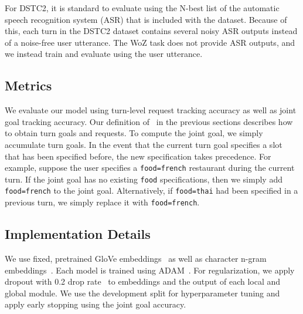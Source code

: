 \documentclass[11pt,a4paper]{article}
\begin{document}
For DSTC2, it is standard to evaluate using the N-best list of the automatic speech recognition system (ASR) that is included with the dataset.
Because of this, each turn in the DSTC2 dataset contains several noisy ASR outputs instead of a noise-free user utterance.
The WoZ task does not provide ASR outputs, and we instead train and evaluate using the user utterance.




\subsection{Metrics}
We evaluate our model using turn-level request tracking accuracy as well as joint goal tracking accuracy.
Our definition of \modelnameshort~in the previous sections describes how to obtain turn goals and requests.
To compute the joint goal, we simply accumulate turn goals.
In the event that the current turn goal specifies a slot that has been specified before, the new specification takes precedence.
For example, suppose the user specifies a \texttt{food=french} restaurant during the current turn. 
If the joint goal has no existing \texttt{food} specifications, then we simply add \texttt{food=french} to the joint goal.
Alternatively, if \texttt{food=thai} had been specified in a previous turn, we simply replace it with \texttt{food=french}.





\subsection{Implementation Details}
We use fixed, pretrained GloVe embeddings~\cite{pennington2014glove} as well as character n-gram embeddings~\cite{Hashimoto2017joint}.
Each model is trained using ADAM~\cite{kingma2014adam}.
For regularization, we apply dropout with 0.2 drop rate~\cite{srivastava2014dropout} to embeddings and the output of each local and global module.
We use the development split for hyperparameter tuning and apply early stopping using the joint goal accuracy.

\end{document}

